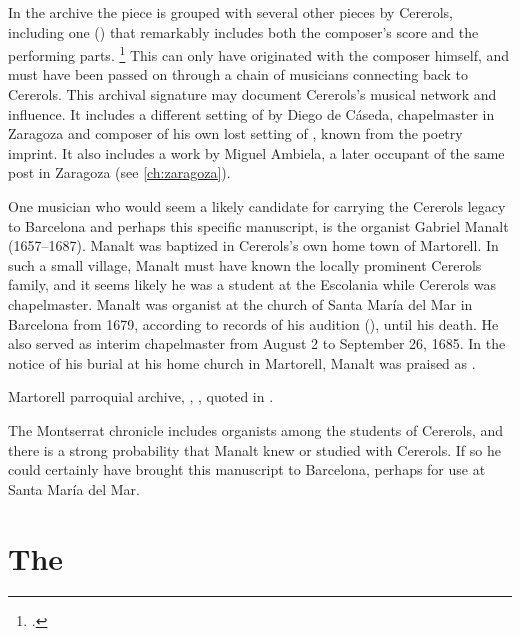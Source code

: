 In the archive the piece is grouped with several other pieces by Cererols,
including one () that remarkably includes
both the composer's score and the performing parts.%
    \footnote{.}
This can only have originated with the composer himself, and must have been
passed on through a chain of musicians connecting back to Cererols.
This archival signature may document Cererols's musical network and influence.
It includes a different setting of  by Diego
de Cáseda, chapelmaster in Zaragoza and composer of his own lost setting of
, known from the poetry imprint.
It also includes a work by Miguel Ambiela, a later occupant of the same post in
Zaragoza (see \cref{ch:zaragoza}).

One musician who would seem a likely candidate for carrying the Cererols legacy
to Barcelona and perhaps this specific manuscript, is the organist Gabriel
Manalt (1657--1687).%
    \Autocite{Balanza:CererolsFamily}
Manalt was baptized in Cererols's own home town of Martorell.
In such a small village, Manalt must have known the locally prominent Cererols
family, and it seems likely he was a student at the Escolania while Cererols was
chapelmaster.
Manalt was organist at the church of Santa María del Mar in Barcelona from 1679,
according to records of his audition (), until his death.
He also served as interim chapelmaster from August 2 to September 26, 1685.%
    \Autocite[70--71]{Balanza:CererolsFamily}
In the notice of his burial at his home church in Martorell, Manalt was praised
as .%
\begin{Footnote}
    Martorell parroquial archive, ,
    , quoted in 
    \autocite[70]{Balanza:CererolsFamily}.
\end{Footnote}
The Montserrat chronicle includes organists among the students of Cererols, and
there is a strong probability that Manalt knew or studied with Cererols.
If so he could certainly have brought this manuscript to Barcelona, perhaps for
use at Santa María del Mar.

\section{The }

